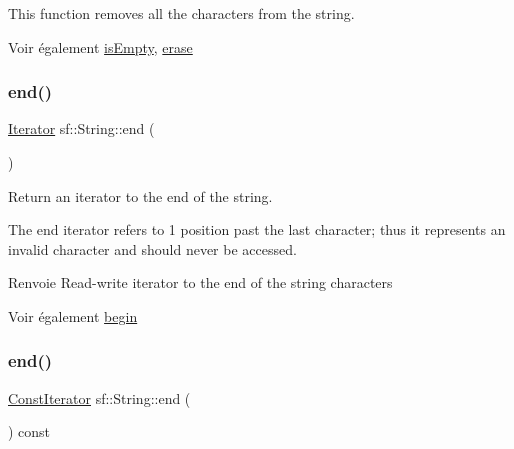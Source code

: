 This function removes all the characters from the string.

\begin{DoxySeeAlso}{Voir également}
\hyperlink{classsf_1_1String_a2ba26cb6945d2bbb210b822f222aa7f6}{is\+Empty}, \hyperlink{classsf_1_1String_aaa78a0a46b3fbe200a4ccdedc326eb93}{erase} 
\end{DoxySeeAlso}
\mbox{\label{classsf_1_1String_ac823012f39cb6f61100418876e99d53b}} 
\subsubsection{\texorpdfstring{end()}{end()}\hspace{0.1cm}{\footnotesize\ttfamily [1/2]}}
{\footnotesize\ttfamily \hyperlink{classsf_1_1String_ac90f2b7b28f703020f8d027e98806235}{Iterator} sf\+::\+String\+::end (\begin{DoxyParamCaption}{ }\end{DoxyParamCaption})}



Return an iterator to the end of the string. 

The end iterator refers to 1 position past the last character; thus it represents an invalid character and should never be accessed.

\begin{DoxyReturn}{Renvoie}
Read-\/write iterator to the end of the string characters
\end{DoxyReturn}
\begin{DoxySeeAlso}{Voir également}
\hyperlink{classsf_1_1String_a8ec30ddc08e3a6bd11c99aed782f6dfe}{begin} 
\end{DoxySeeAlso}
\mbox{\label{classsf_1_1String_af1ab4c82ff2bdfb6903b4b1bb78a8e5c}} 
\subsubsection{\texorpdfstring{end()}{end()}\hspace{0.1cm}{\footnotesize\ttfamily [2/2]}}
{\footnotesize\ttfamily \hyperlink{classsf_1_1String_a8e18efc2e8464f6eb82818902d527efa}{Const\+Iterator} sf\+::\+String\+::end (\begin{DoxyParamCaption}{ }\end{DoxyParamCaption}) const}




